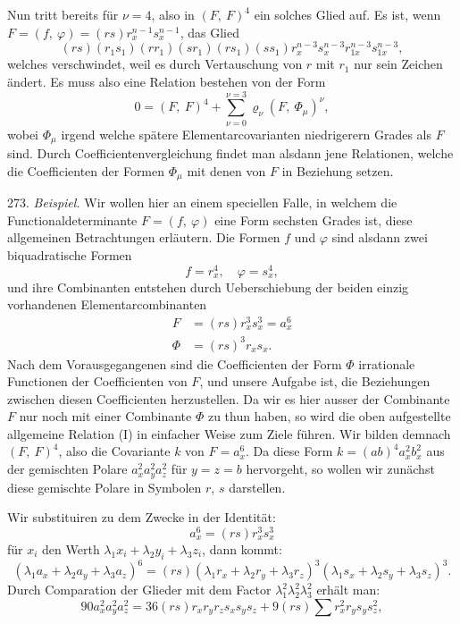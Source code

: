 \documentclass[11pt]{article}
\providecommand{\weberpage}[1]{}
\providecommand{\weq}[2]{\begin{equation}\tag{#1}#2\end{equation}}
\begin{document}
\weberpage{296}

Nun tritt bereits für $\nu=4$, also in $(F,\ F)^4$ ein solches Glied
auf. Es ist, wenn $F=(f,\ \varphi)=(rs)r_x^{n-1}s_x^{n-1}$, das Glied
\[
(rs)(r_1s_1)(rr_1)(sr_1)(rs_1)(ss_1)r_x^{n-3}s_x^{n-3}r_{1x}^{n-3}s_{1x}^{n-3},
\]
welches verschwindet, weil es durch Vertauschung von $r$ mit $r_1$ nur
sein Zeichen ändert. Es muss also eine Relation bestehen von der
Form
\weq{I}{0=(F,\ F)^4+\sum_{\nu=0}^{\nu=3}\varrho_\nu(F,\ \varPhi_\mu)^\nu,}
wobei $\varPhi_\mu$ irgend welche spätere Elementarcovarianten niedrigerern %
Grades als $F$ sind. Durch Coefficientenvergleichung findet man alsdann
 jene Relationen, welche die Coefficienten der Formen $\varPhi_\mu$ mit
denen von $F$ in Beziehung setzen.

273. \textit{Beispiel.} Wir wollen hier an einem speciellen Falle, in
welchem die Functionaldeterminante $F=(f,\ \varphi)$ eine Form sechsten
Grades ist, diese allgemeinen Betrachtungen erläutern. Die Formen
$f$ und $\varphi$ sind alsdann zwei biquadratische Formen
\[
f=r_x^4,\quad \varphi=s_x^4,
\]
und ihre Combinanten entstehen durch Ueberschiebung der beiden
einzig vorhandenen Elementarcombinanten
\[
\begin{aligned}
F &= (rs)r_x^3s_x^3=a_x^6\\
\varPhi &= (rs)^3r_xs_x.
\end{aligned}
\]
Nach dem Vorausgegangenen sind die Coefficienten der Form $\varPhi$
irrationale Functionen der Coefficienten von $F$, und unsere Aufgabe
ist, die Beziehungen zwischen diesen Coefficienten herzustellen. Da
wir es hier ausser der Combinante $F$ nur noch mit einer Combinante
$\varPhi$ zu thun haben, so wird die oben aufgestellte allgemeine Relation
(I) in einfacher Weise zum Ziele führen. Wir bilden demnach $(F,\ F)^4$,
also die Covariante $k$ von $F=a_x^6$. Da diese Form $k=(ab)^4a_x^2b_x^2$
aus der gemischten Polare $a_x^2a_y^2a_z^2$ für $y=z=b$ hervorgeht, so wollen
wir zunächst diese gemischte Polare in Symbolen $r$, $s$ darstellen.

Wir substituiren zu dem Zwecke in der Identität:
\[
a_x^6=(rs)r_x^3s_x^3
\]
für $x_i$ den Werth $\lambda_1x_i+\lambda_2y_i+\lambda_3z_i$, dann kommt:
\[
(\lambda_1a_x+\lambda_2a_y+\lambda_3a_z)^6=(rs)(\lambda_1r_x+\lambda_2r_y+\lambda_3r_z)^3(\lambda_1s_x+\lambda_2s_y+\lambda_3s_z)^3.
\]
Durch Comparation der Glieder mit dem Factor $\lambda_1^2\lambda_2^2\lambda_3^2$ erhält man:
\[
90a_x^2a_y^2a_z^2=36(rs)r_xr_yr_zs_xs_ys_z+9(rs)\sum r_x^2r_ys_ys_z^2,
\]
\end{document}
